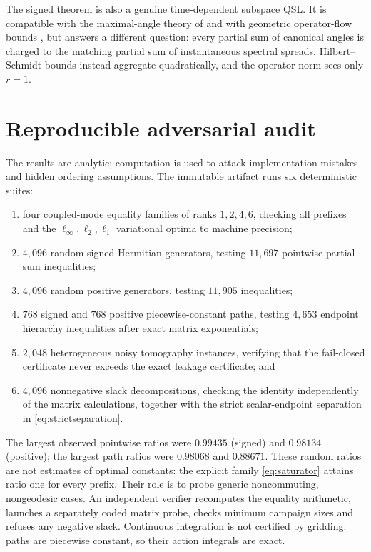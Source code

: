 \documentclass[11pt]{article}
\theoremstyle{definition}
\theoremstyle{remark}
\begin{document}
The signed theorem is also a genuine time-dependent subspace QSL.  It is
compatible with the maximal-angle theory of
\cite{AlbeverioMotovilov2022a,AlbeverioMotovilov2022b} and with geometric
operator-flow bounds \cite{CarabbaEtAl2022,HornedalEtAl2023}, but answers a
different question: every partial sum of canonical angles is charged to the
matching partial sum of instantaneous spectral spreads.  Hilbert--Schmidt
bounds instead aggregate quadratically, and the operator norm sees only
$r=1$.

\section{Reproducible adversarial audit}

The results are analytic; computation is used to attack implementation
mistakes and hidden ordering assumptions.  The immutable artifact runs six
deterministic suites:
\begin{enumerate}
 \item four coupled-mode equality families of ranks $1,2,4,6$, checking all
 prefixes and the $\ell_\infty,\ell_2,\ell_1$ variational optima to machine
 precision;
 \item $4{,}096$ random signed Hermitian generators, testing $11{,}697$
 pointwise partial-sum inequalities;
 \item $4{,}096$ random positive generators, testing $11{,}905$ inequalities;
 \item $768$ signed and $768$ positive piecewise-constant paths, testing
 $4{,}653$ endpoint hierarchy inequalities after exact matrix exponentials;
 \item $2{,}048$ heterogeneous noisy tomography instances, verifying that the
 fail-closed certificate never exceeds the exact leakage certificate; and
 \item $4{,}096$ nonnegative slack decompositions, checking the identity
 independently of the matrix calculations, together with the strict
 scalar-endpoint separation in \eqref{eq:strictseparation}.
\end{enumerate}

The largest observed pointwise ratios were $0.99435$ (signed) and $0.98134$
(positive); the largest path ratios were $0.98068$ and $0.88671$.  These
random ratios are not estimates of optimal constants: the explicit family
\eqref{eq:saturator} attains ratio one for every prefix.  Their role is to
probe generic noncommuting, nongeodesic cases.  An independent verifier
recomputes the equality arithmetic, launches a separately coded matrix probe,
checks minimum campaign sizes and refuses any negative slack.  Continuous
integration is not certified by gridding: paths are piecewise constant, so
their action integrals are exact.
\end{document}
